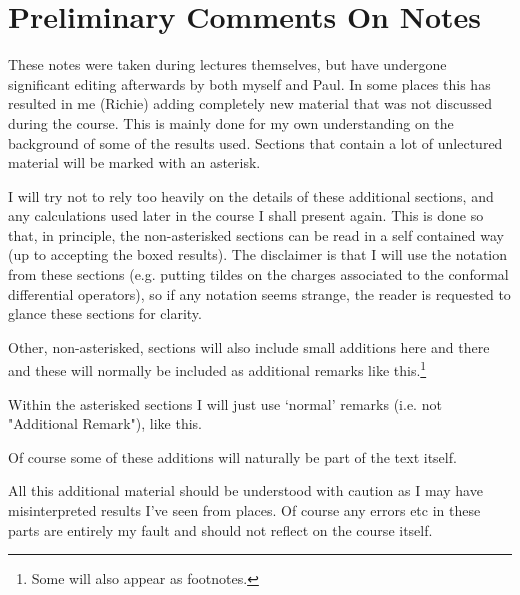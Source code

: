 \chapter{Preliminary Comments On Notes}

These notes were taken during lectures themselves, but have undergone significant editing afterwards by both myself and Paul. In some places this has resulted in me (Richie) adding completely new material that was not discussed during the course. This is mainly done for my own understanding on the background of some of the results used. Sections that contain a lot of unlectured material will be marked with an asterisk.


I will try not to rely too heavily on the details of these additional sections, and any calculations used later in the course I shall present again. This is done so that, in principle, the non-asterisked sections can be read in a self contained way (up to accepting the boxed results). The disclaimer is that I will use the notation from these sections (e.g. putting tildes on the charges associated to the conformal differential operators), so if any notation seems strange, the reader is requested to glance these sections for clarity.  

\badr 
    Other, non-asterisked, sections will also include small additions here and there and these will normally be included as additional remarks like this.\footnote{Some will also appear as footnotes.} 
\eadr

\br
    Within the asterisked sections I will just use `normal' remarks (i.e. not "Additional Remark"), like this.
\er     

Of course some of these additions will naturally be part of the text itself. 

All this additional material should be understood with caution as I may have misinterpreted results I've seen from places. Of course any errors etc in these parts are entirely my fault and should not reflect on the course itself. 